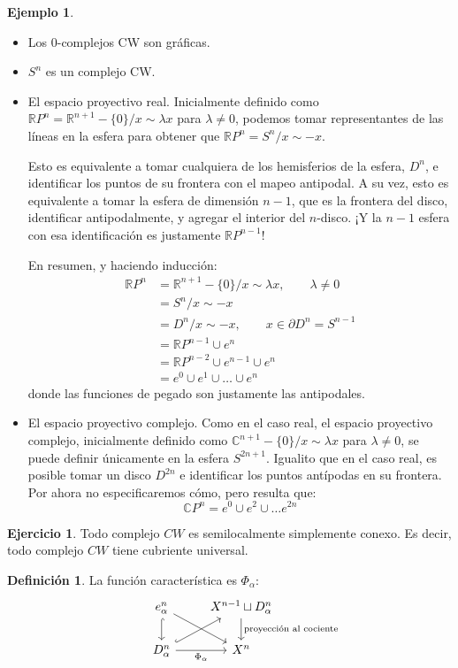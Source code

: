 \documentclass[spanish]{book}
\theoremstyle{definition}
\newtheorem*{defn}{Definición}
\newtheorem*{ejer}{Ejercicio}
\newtheorem*{ejem}{Ejemplo}
\newcommand{\R}{\mathbb{R}}
\newcommand{\C}{\mathbb{C}}
\begin{document}
	\begin{ejem}\leavevmode
		\begin{itemize}
			\item Los 0-complejos CW son gráficas.
			\item $S^n$ es un complejo CW.
			\item El espacio proyectivo real. Inicialmente definido como $\R P^n=\R^{n+1}-\{0\}/x\sim\lambda x$ para $\lambda\neq0$, podemos tomar representantes de las líneas en la esfera para obtener que $\R P^n=S^n/x\sim -x$. 
			
			Esto es equivalente a tomar cualquiera de los hemisferios de la esfera, $D^{n}$, e identificar los puntos de su frontera con el mapeo antipodal. A su vez, esto es equivalente a tomar la esfera de dimensión $n-1$, que es la frontera del disco, identificar antipodalmente, y agregar el interior del $n$-disco. ¡Y la $n-1$ esfera con esa identificación es justamente $\R P^{n-1}$!
			
			En resumen, y haciendo inducción:
				\begin{align*}
					\R P^n&=\R^{n+1}-\{0\}/x\sim\lambda x,\qquad\lambda\neq0\\
					&=S^n/x\sim-x\\
					&=D^n/x\sim-x,\qquad x\in\partial D^n=S^{n-1}\\
					&=\R P^{n-1}\cup e^n\\
					&=\R P^{n-2}\cup e^{n-1}\cup e^n\\
					&=e^0\cup e^1\cup\ldots\cup e^n
				\end{align*}
				donde las funciones de pegado son justamente las antipodales.
			\item El espacio proyectivo complejo. Como en el caso real, el espacio proyectivo complejo, inicialmente definido como $\C^{n+1}-\{0\}/x\sim\lambda x$ para $\lambda\neq0$, se puede definir únicamente en la esfera $S^{2n+1}$. Igualito que en el caso real, es posible tomar un disco $D^{2n}$ e identificar los puntos antípodas en su frontera. Por ahora no especificaremos cómo, pero resulta que:
			\[\C P^n=e^0\cup e^2\cup\ldots e^{2n}\]
		\end{itemize}
	\end{ejem}
	\begin{ejer}
		Todo complejo $CW$ es semilocalmente simplemente conexo. Es decir, todo complejo $CW$ tiene cubriente universal.
	\end{ejer}
	\begin{defn}
		La función característica es $\Phi_\alpha$:
		\[\begin{tikzcd}
			&e^n_\alpha \ar[rd] \ar[d, hook] & X^{n-1} \sqcup D_\alpha^n \ar[d, "\text{proyección al cociente}"] \\
			&D^n_\alpha \ar[ur,hook] \ar[r, "\Phi_\alpha"'] & X^n
		\end{tikzcd}\]
	\end{defn}
\end{document}
